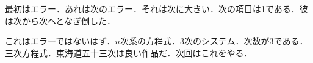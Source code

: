最初はエラー．あれは次のエラー．それは次に大きい．次の項目は1である．彼は次から次へとなぎ倒した．

これはエラーではないはず．$n$次系の方程式．3次のシステム．次数が3である．三次方程式．東海道五十三次は良い作品だ．次回はこれをやる．